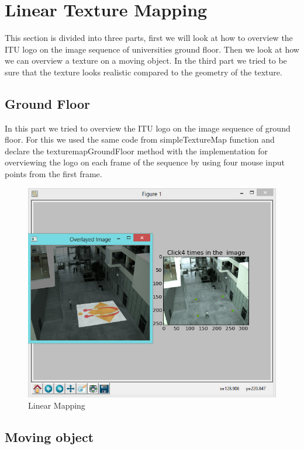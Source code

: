 \section{Linear Texture Mapping}

This section is divided into three parts, ﬁrst we will look at how to overview the ITU logo on the image sequence of universities ground floor. Then we look at how we can overview a texture on a moving object. In the third part we tried to be sure that the texture looks realistic compared to the geometry of the texture.

\subsection{Ground Floor}

In this part we tried to overview the ITU logo on the image sequence of ground floor. For this we used the same code from simpleTextureMap function and declare the texturemapGroundFloor method with the implementation for overviewing the logo on each frame of the sequence by using four mouse input points from the first frame.

\begin{figure}[h!]
	\centering
	\includegraphics[width=\textwidth]{Handin2/images/linearmapping.jpg}
	\caption{Linear Mapping}
	\label{fig:linearmapping}
\end{figure}

\subsection{Moving object}

